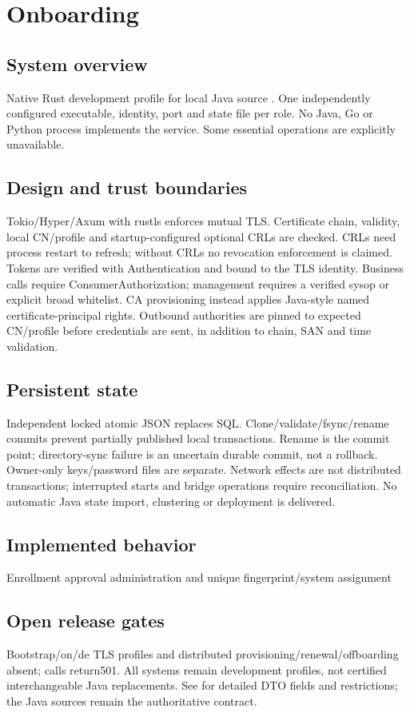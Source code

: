 \documentclass[a4paper]{arrowhead}
\begin{document}
\section{Onboarding}
\subsection{System overview}
Native Rust development profile for local Java source . One independently configured executable, identity, port and state file per role. No Java, Go or Python process implements the service. Some essential operations are explicitly unavailable.
\subsection{Design and trust boundaries}
Tokio/Hyper/Axum with rustls enforces mutual TLS. Certificate chain, validity, local CN/profile and startup-configured optional CRLs are checked. CRLs need process restart to refresh; without CRLs no revocation enforcement is claimed. Tokens are verified with Authentication and bound to the TLS identity. Business calls require ConsumerAuthorization; management requires a verified sysop or explicit broad whitelist. CA provisioning instead applies Java-style named certificate-principal rights. Outbound authorities are pinned to expected CN/profile before credentials are sent, in addition to chain, SAN and time validation.
\subsection{Persistent state}
Independent locked atomic JSON replaces SQL. Clone/validate/fsync/rename commits prevent partially published local transactions. Rename is the commit point; directory-sync failure is an uncertain durable commit, not a rollback. Owner-only keys/password files are separate. Network effects are not distributed transactions; interrupted starts and bridge operations require reconciliation. No automatic Java state import, clustering or deployment is delivered.
\subsection{Implemented behavior}
Enrollment approval administration and unique fingerprint/system assignment
\subsection{Open release gates}
Bootstrap/on/de TLS profiles and distributed provisioning/renewal/offboarding absent; calls return501. All systems remain development profiles, not certified interchangeable Java replacements. See  for detailed DTO fields and restrictions; the Java sources remain the authoritative contract.
\end{document}
